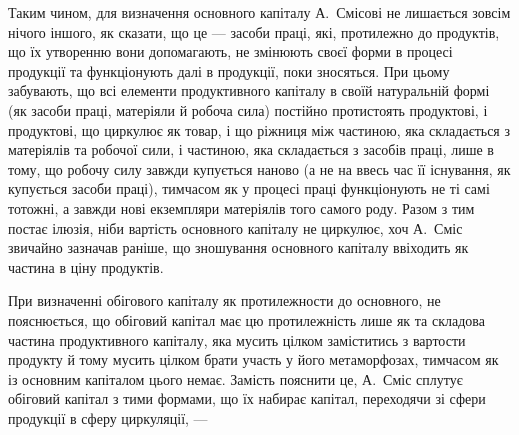 Таким чином, для визначення основного капіталу А.~Смісові не лишається
зовсім нічого іншого, як сказати, що це — засоби праці, які, протилежно
до продуктів, що їх утворенню вони допомагають, не змінюють
своєї форми в процесі продукції та функціонують далі в продукції, поки
зносяться. При цьому забувають, що всі елементи продуктивного капіталу
в своїй натуральній формі (як засоби праці, матеріяли й робоча сила)
постійно протистоять продуктові, і продуктові, що циркулює як товар,
і що ріжниця між частиною, яка складається з матеріялів та робочої
сили, і частиною, яка складається з засобів праці, лише в тому, що
робочу силу завжди купується наново (а не на ввесь час її існування,
як купується засоби праці), тимчасом як у процесі праці функціонують
не ті самі тотожні, а завжди нові екземпляри матеріялів того самого роду.
Разом з тим постає ілюзія, ніби вартість основного капіталу не циркулює,
хоч А.~Сміс звичайно зазначав раніше, що зношування основного
капіталу ввіходить як частина в ціну продуктів.

При визначенні обігового капіталу як протилежности до основного,
не пояснюється, що обіговий капітал має цю протилежність лише як та
складова частина продуктивного капіталу, яка мусить цілком заміститись
з вартости продукту й тому мусить цілком брати участь у його
метаморфозах, тимчасом як із основним капіталом цього немає. Замість
пояснити це, А.~Сміс сплутує обіговий капітал з тими формами, що їх
набирає капітал, переходячи зі сфери продукції в сферу циркуляції, —
\parbreak{}  %
